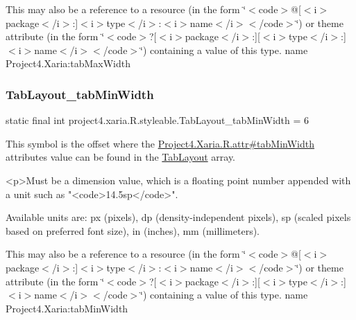This may also be a reference to a resource (in the form \char`\"{}$<$code$>$@\mbox{[}$<$i$>$package$<$/i$>$\+:\mbox{]}$<$i$>$type$<$/i$>$\+:$<$i$>$name$<$/i$>$$<$/code$>$\char`\"{}) or theme attribute (in the form \char`\"{}$<$code$>$?\mbox{[}$<$i$>$package$<$/i$>$\+:\mbox{]}\mbox{[}$<$i$>$type$<$/i$>$\+:\mbox{]}$<$i$>$name$<$/i$>$$<$/code$>$\char`\"{}) containing a value of this type.  name Project4.\+Xaria\+:tab\+Max\+Width \mbox{\label{classproject4_1_1xaria_1_1R_1_1styleable_a1999d406b522edbecdcd457eab2b11c7}} 
\subsubsection{\texorpdfstring{Tab\+Layout\+\_\+tab\+Min\+Width}{TabLayout\_tabMinWidth}}
{\footnotesize\ttfamily static final int project4.\+xaria.\+R.\+styleable.\+Tab\+Layout\+\_\+tab\+Min\+Width = 6\hspace{0.3cm}{\ttfamily [static]}}

This symbol is the offset where the \hyperlink{}{Project4.\+Xaria.\+R.\+attr\#tab\+Min\+Width} attribute\textquotesingle{}s value can be found in the \hyperlink{classproject4_1_1xaria_1_1R_1_1styleable_ab6bfb1f97ae9fba16f4f90d50871d4a8}{Tab\+Layout} array.

\begin{DoxyVerb}      <p>Must be a dimension value, which is a floating point number appended with a unit such as "<code>14.5sp</code>".
\end{DoxyVerb}
 Available units are\+: px (pixels), dp (density-\/independent pixels), sp (scaled pixels based on preferred font size), in (inches), mm (millimeters). 

This may also be a reference to a resource (in the form \char`\"{}$<$code$>$@\mbox{[}$<$i$>$package$<$/i$>$\+:\mbox{]}$<$i$>$type$<$/i$>$\+:$<$i$>$name$<$/i$>$$<$/code$>$\char`\"{}) or theme attribute (in the form \char`\"{}$<$code$>$?\mbox{[}$<$i$>$package$<$/i$>$\+:\mbox{]}\mbox{[}$<$i$>$type$<$/i$>$\+:\mbox{]}$<$i$>$name$<$/i$>$$<$/code$>$\char`\"{}) containing a value of this type.  name Project4.\+Xaria\+:tab\+Min\+Width \mbox{\label{classproject4_1_1xaria_1_1R_1_1styleable_afcef95dafaf4ae2b599ba4d8353ffddf}} 
